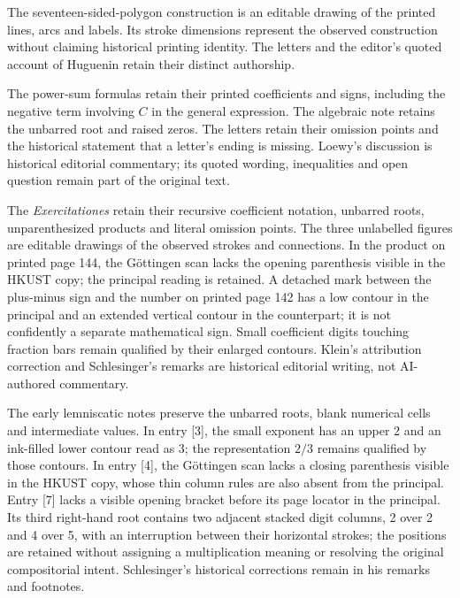 The seventeen-sided-polygon construction is an editable drawing of the printed lines, arcs and labels. Its stroke dimensions represent the observed construction without claiming historical printing identity. The letters and the editor’s quoted account of Huguenin retain their distinct authorship.

The power-sum formulas retain their printed coefficients and signs, including the negative term involving $C$ in the general expression. The algebraic note retains the unbarred root and raised zeros. The letters retain their omission points and the historical statement that a letter’s ending is missing. Loewy’s discussion is historical editorial commentary; its quoted wording, inequalities and open question remain part of the original text.

The \textit{Exercitationes} retain their recursive coefficient notation, unbarred roots, unparenthesized products and literal omission points. The three unlabelled figures are editable drawings of the observed strokes and connections. In the product on printed page 144, the Göttingen scan lacks the opening parenthesis visible in the HKUST copy; the principal reading is retained. A detached mark between the plus-minus sign and the number on printed page 142 has a low contour in the principal and an extended vertical contour in the counterpart; it is not confidently a separate mathematical sign. Small coefficient digits touching fraction bars remain qualified by their enlarged contours. Klein’s attribution correction and Schlesinger’s remarks are historical editorial writing, not AI-authored commentary.

The early lemniscatic notes preserve the unbarred roots, blank numerical cells and intermediate values. In entry [3], the small exponent has an upper 2 and an ink-filled lower contour read as 3; the representation $2/3$ remains qualified by those contours. In entry [4], the Göttingen scan lacks a closing parenthesis visible in the HKUST copy, whose thin column rules are also absent from the principal. Entry [7] lacks a visible opening bracket before its page locator in the principal. Its third right-hand root contains two adjacent stacked digit columns, 2 over 2 and 4 over 5, with an interruption between their horizontal strokes; the positions are retained without assigning a multiplication meaning or resolving the original compositorial intent. Schlesinger’s historical corrections remain in his remarks and footnotes.

